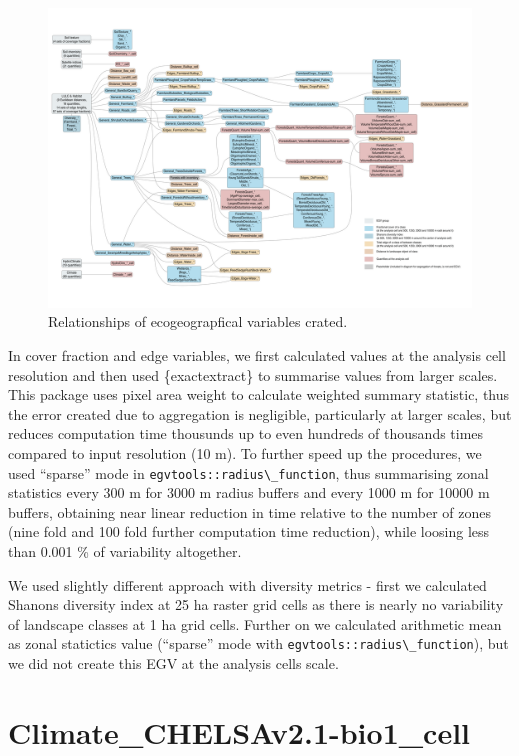 \documentclass[
]{book}
\newcommand{\passthrough}[1]{#1}
\begin{document}
\begin{figure}
\includegraphics[width=1\linewidth]{./Figures/EGV_FlowChartY_eps_krasains_300dpi_2} \caption{Relationships of ecogeograpfical variables crated.}\label{fig:flowchart}
\end{figure}

In cover fraction and edge variables, we first calculated values at the analysis
cell resolution and then used \{exactextract\} to summarise values from larger scales.
This package uses pixel area weight to calculate weighted summary statistic, thus the
error created due to aggregation is negligible, particularly at larger scales, but
reduces computation time thousunds up to even hundreds of thousands times compared
to input resolution (10 m). To further speed up the procedures, we used ``sparse''
mode in \passthrough{\lstinline!egvtools::radius\_function!}, thus summarising zonal statistics every 300 m for
3000 m radius buffers and every 1000 m for 10000 m buffers, obtaining near linear
reduction in time relative to the number of zones (nine fold and 100 fold further
computation time reduction), while loosing less than 0.001 \% of variability altogether.

We used slightly different approach with diversity metrics - first we calculated
Shanons diversity index at 25 ha raster grid cells as there is nearly no variability
of landscape classes at 1 ha grid cells. Further on we calculated arithmetic mean as
zonal statictics value (``sparse'' mode with \passthrough{\lstinline!egvtools::radius\_function!}), but we
did not create this EGV at the analysis cells scale.

\section{Climate\_CHELSAv2.1-bio1\_cell}\label{ch06.001}
\end{document}
